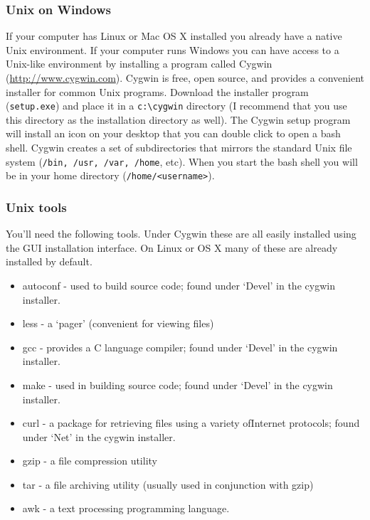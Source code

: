 \documentclass[10pt,letterpaper]{article}
\begin{document}
\subsubsection*{Unix on Windows}

If your computer has Linux or Mac OS X installed you already have a native Unix environment.  If your computer runs Windows you can have access to a Unix-like environment by installing a program called Cygwin (\href{http://www.cygwin.com}{http://www.cygwin.com}).  Cygwin is free, open source, and provides a convenient installer for common Unix programs.  Download the installer program (\verb=setup.exe=) and place it in a \verb=c:\cygwin= directory (I recommend that you use this directory as the installation directory as well).  The Cygwin setup program will install an icon on your desktop that you can double click to open a bash shell. Cygwin creates a set of subdirectories that mirrors the standard Unix file system (\verb=/bin, /usr, /var, /home=, etc). When you start the bash shell you will be in your home directory (\verb=/home/<username>=).

\subsubsection*{Unix tools}

You'll need the following tools. Under Cygwin these are all easily installed using the GUI installation interface. On Linux or OS X many of these are already installed by default.

\begin{itemize}
    \item autoconf - used to build source code; found under `Devel' in the cygwin installer.
    \item less - a `pager' (convenient for viewing files)
    \item gcc - provides a C language compiler; found under `Devel' in the cygwin installer.
    \item make - used in building source code; found under `Devel' in the cygwin installer.
    \item curl - a package for retrieving files using a variety ofInternet protocols; found under `Net' in the cygwin installer.
    \item gzip - a file compression utility
    \item tar - a file archiving utility (usually used in conjunction with gzip)
    \item awk - a text processing programming language.
\end{itemize}
\end{document}

